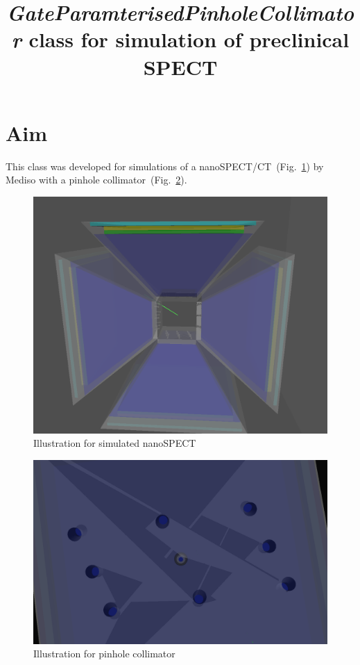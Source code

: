 \documentclass[12pt]{article}
\begin{document}
\title{\textit{GateParamterisedPinholeCollimator} class for simulation of preclinical SPECT}
\maketitle
\tableofcontents
\newpage



\pagebreak


\section{Aim}
This class was developed for simulations of a nanoSPECT/CT~(Fig.~\ref{fig:scanner}) by Mediso with a pinhole collimator~(Fig.~\ref{fig:colli}).
 
\begin{figure}[htp]
\centering
\includegraphics[scale=0.3]{figs/scanner.png}
\caption{Illustration for simulated nanoSPECT}
\label{fig:scanner}
\end{figure}

\begin{figure}[htp]
\centering
\includegraphics[scale=0.3]{figs/colli.png}
\caption{Illustration for pinhole collimator}
\label{fig:colli}
\end{figure}
\end{document}
